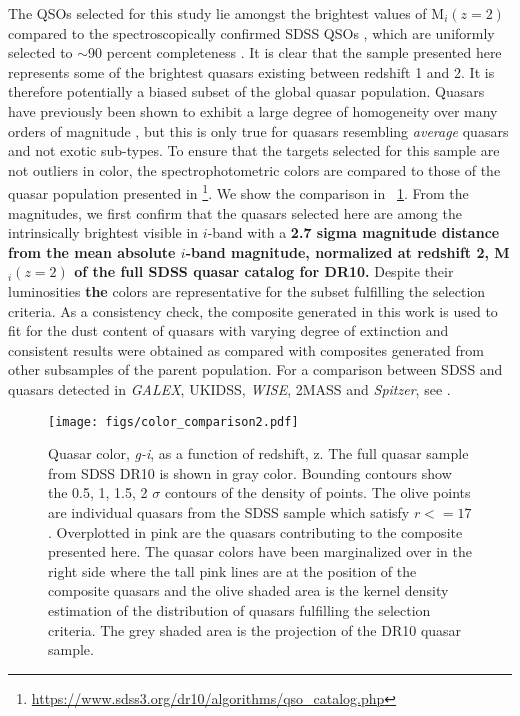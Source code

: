 \documentclass{aa}    %
\newcommand{\figref}[1]{\ref{fig:#1}}
\newcommand{\Fig}[1]{\figurename~\figref{#1}}
\newcommand{\fig}[1]{\Fig{#1}}
\newcommand{\figlabel}[1]{\label{fig:#1}}
\begin{document}
The QSOs selected for this study lie amongst the brightest values of
M$_i(z=2)$ compared to the spectroscopically confirmed SDSS QSOs
\citep{Shen2011}, which are uniformly selected to $\sim$90 percent
completeness \citep{Richards2002, VandenBerk2005}. It is clear that
the sample presented here represents some of the brightest quasars
existing between redshift 1 and 2. It is therefore potentially a
biased subset of the global quasar population. Quasars have previously
been shown to exhibit a large degree of homogeneity over many orders
of magnitude \citep{Dietrich2002}, but this is only true for quasars
resembling \textit{average} quasars and not exotic sub-types. To
ensure that the targets selected for this sample are not outliers in
color, the spectrophotometric colors are compared to those of the
quasar population presented in
\citet{Paris2014}\footnote{\url{https://www.sdss3.org/dr10/algorithms/qso_catalog.php}}.
We
show the comparison in \fig{color_comparison}. From the magnitudes, we
first confirm that the quasars selected here are among the
intrinsically brightest visible in $i$-band with a \textbf{2.7 sigma magnitude
distance from the mean absolute $i$-band magnitude, normalized at redshift 2,
M$_i(z=2)$ of the full SDSS quasar catalog for DR10.} Despite their luminosities \textbf{the} colors are representative
for the subset fulfilling the selection criteria. As a consistency
check, the composite generated in this work is used to fit for the
dust content of quasars with varying degree of extinction and
consistent results were obtained as compared with composites generated
from other subsamples of the parent population. For a comparison
between SDSS and quasars detected in \textit{GALEX}, UKIDSS,
\textit{WISE}, 2MASS and \textit{Spitzer}, see
\citet{Krawczyk2013}.


 \begin{figure}[t!]
   \centering
   \texttt{[image: figs/color\_comparison2.pdf]}
   \caption[]{Quasar color, \textit{g-i},  as a function of redshift, z. The
full quasar sample from SDSS DR10 \citep{Paris2014} is shown in gray color.
Bounding contours show the 0.5, 1, 1.5, 2 $\sigma$ contours of the density of
points. The olive points are individual quasars from the SDSS sample which
satisfy $r <= 17$. Overplotted in pink are the quasars contributing to the
composite presented here. The quasar colors have been marginalized over in the
right side where the tall pink lines are at the position of the composite
quasars and the olive shaded area is the kernel density estimation of the
distribution of quasars fulfilling the selection criteria. The grey shaded area
is the projection of the DR10 quasar sample.}
  \figlabel{color_comparison}
 \end{figure}
\end{document}
